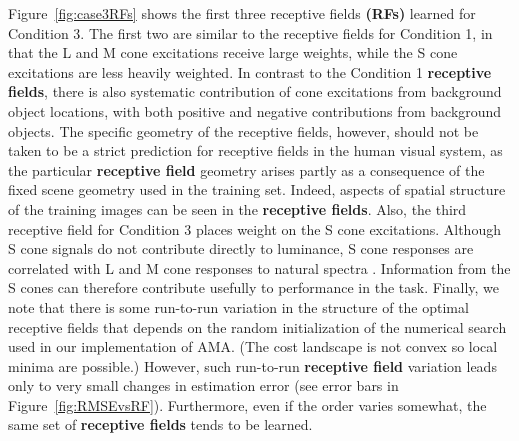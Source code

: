 \documentclass{jov}
\providecommand{\DIFaddtex}[1]{{\bf #1}} %
\providecommand{\DIFdeltex}[1]{} %
\providecommand{\DIFaddbegin}{} %
\providecommand{\DIFaddend}{} %
\providecommand{\DIFdelbegin}{} %
\providecommand{\DIFdelend}{} %
\providecommand{\DIFadd}[1]{\texorpdfstring{\DIFaddtex{#1}}{#1}} %
\providecommand{\DIFdel}[1]{\texorpdfstring{\DIFdeltex{#1}}{}} %
\newcommand{\DIFscaledelfig}{0.5}
\newlength{\DIFdelgraphicswidth} %
\newlength{\DIFdelgraphicsheight} %
\newcommand{\DIFaddincludegraphics}[2][]{{\color{blue}\fbox{\DIFOincludegraphics[#1]{#2}}}} %
\newcommand{\DIFdelincludegraphics}[2][]{%
\sbox{\DIFdelgraphicsbox}{\DIFOincludegraphics[#1]{#2}}%
\settoboxwidth{\DIFdelgraphicswidth}{\DIFdelgraphicsbox} %
\settoboxtotalheight{\DIFdelgraphicsheight}{\DIFdelgraphicsbox} %
\scalebox{\DIFscaledelfig}{%
\parbox[b]{\DIFdelgraphicswidth}{\usebox{\DIFdelgraphicsbox}\\[-\baselineskip] \rule{\DIFdelgraphicswidth}{0em}}\llap{\resizebox{\DIFdelgraphicswidth}{\DIFdelgraphicsheight}{%
\setlength{\unitlength}{\DIFdelgraphicswidth}%
\begin{picture}(1,1)%
\thicklines\linethickness{2pt} %
{\color[rgb]{1,0,0}\put(0,0){\framebox(1,1){}}}%
{\color[rgb]{1,0,0}\put(0,0){\line( 1,1){1}}}%
{\color[rgb]{1,0,0}\put(0,1){\line(1,-1){1}}}%
\end{picture}%
}\hspace*{3pt}}} %
} %
\DeclareRobustCommand{\DIFaddbegin}{\DIFOaddbegin \let\includegraphics\DIFaddincludegraphics} %
\DeclareRobustCommand{\DIFaddend}{\DIFOaddend \let\includegraphics\DIFOincludegraphics} %
\DeclareRobustCommand{\DIFdelbegin}{\DIFOdelbegin \let\includegraphics\DIFdelincludegraphics} %
\DeclareRobustCommand{\DIFdelend}{\DIFOaddend \let\includegraphics\DIFOincludegraphics} %
\begin{document}
Figure~\ref{fig:case3RFs} shows the first three receptive fields \DIFaddbegin \DIFadd{(RFs) }\DIFaddend learned for Condition 3.
The first two are similar to the receptive fields for Condition 1, in that the L and M cone excitations receive large weights, while the S cone excitations are less heavily weighted.
In contrast to the Condition 1 \DIFdelbegin \DIFdel{RFs}\DIFdelend \DIFaddbegin \DIFadd{receptive fields}\DIFaddend , there is also systematic contribution of cone excitations from background object locations, with both positive and negative contributions from background objects. 
The specific geometry of the receptive fields, however, should not be taken to be a strict prediction for receptive fields in the human visual system, as the particular \DIFdelbegin \DIFdel{RF }\DIFdelend \DIFaddbegin \DIFadd{receptive field }\DIFaddend geometry arises partly as a consequence of the fixed scene geometry used in the training set. 
Indeed, aspects of spatial structure of the training images can be seen in the \DIFdelbegin \DIFdel{RFs}\DIFdelend \DIFaddbegin \DIFadd{receptive fields}\DIFaddend . 
Also, the third receptive field for Condition 3 places weight on the S cone excitations.
Although S cone signals do not contribute directly to luminance,  S cone responses are correlated with
L and M cone responses to natural spectra \cite{burton1987color, benson2014unsupervised}.
Information from the S cones can therefore contribute usefully to performance in the task. 
Finally, we note that there is some run-to-run variation in the structure of the optimal receptive fields that depends on the random initialization of the numerical search used in our implementation of AMA. 
(The cost landscape is not convex so local minima are possible.) 
However, such run-to-run \DIFdelbegin \DIFdel{RF }\DIFdelend \DIFaddbegin \DIFadd{receptive field }\DIFaddend variation leads only to very small changes in estimation error (see error bars in Figure~\ref{fig:RMSEvsRF}). 
Furthermore, even if the order varies somewhat, the same set of \DIFdelbegin \DIFdel{RFs }\DIFdelend \DIFaddbegin \DIFadd{receptive fields }\DIFaddend tends to be learned.
\end{document}
